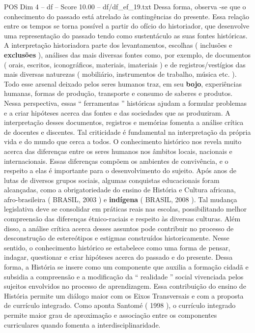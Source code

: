 \begin{textsample}{POS Dim 4 – df – Score 10.00 – df/df\_ef\_19.txt}
Dessa forma, observa -se que o conhecimento do passado está atrelado às contingências do presente.
Essa relação entre os tempos se torna possível a partir do ofício do historiador, que desenvolve uma representação do passado tendo como sustentáculo as suas fontes históricas.
A interpretação historiadora parte dos levantamentos, escolhas ( inclusões e \textbf{exclusões} ), análises das mais diversas fontes como, por exemplo, de documentos ( orais, escritos, iconográficos, materiais, imateriais ) e de registros/vestígios das mais diversas naturezas ( mobiliário, instrumentos de trabalho, música etc. ).
Todo esse arsenal deixado pelos seres humanos traz, em seu \textbf{bojo}, experiências humanas, formas de produção, transporte e consumo de saberes e produtos.
Nessa perspectiva, essas “ ferramentas ” históricas ajudam a formular problemas e a criar hipóteses acerca das fontes e das sociedades que as produziram.
A interpretação desses documentos, registros e memórias fomenta a análise crítica de docentes e discentes.
Tal criticidade é fundamental na interpretação da própria vida e do mundo que cerca a todos.
O conhecimento histórico nos revela muito acerca das diferenças entre os seres humanos nos âmbitos locais, nacionais e internacionais.
Essas diferenças compõem os ambientes de convivência, e o respeito a elas é importante para o desenvolvimento do sujeito.
Após anos de lutas de diversos grupos sociais, algumas conquistas educacionais foram alcançadas, como a obrigatoriedade do ensino de História e Cultura africana, afro-brasileira ( BRASIL, 2003 ) e \textbf{indígena} ( BRASIL, 2008 ).
Tal mudança legislativa deve se consolidar em práticas reais nas escolas, possibilitando melhor compreensão das diferenças étnico-raciais e respeito às diversas culturas.
Além disso, a análise crítica acerca desses assuntos pode contribuir no processo de desconstrução de estereótipos e estigmas construídos historicamente.
Nesse sentido, o conhecimento histórico se estabelece como uma forma de pensar, indagar, questionar e criar hipóteses acerca do passado e do presente.
Dessa forma, a História se insere como um componente que auxilia a formação cidadã e subsidia a compreensão e a modificação da “ realidade ” social vivenciada pelos sujeitos envolvidos no processo de aprendizagem.
Essa contribuição do ensino de História permite um diálogo maior com os Eixos Transversais e com a proposta de currículo integrado.
Como aponta Santomé ( 1998 ), o currículo integrado permite maior grau de aproximação e associação entre os componentes curriculares quando fomenta a interdisciplinaridade.

\end{textsample}
